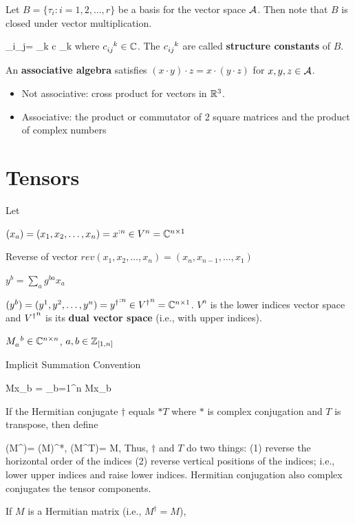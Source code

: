 Let $B = \{\tau_i: i=1, 2, \ldots, r\}$
be a basis for the vector space ${\cal A}$. 
Then note that
$B$ is closed under vector multiplication. 

\beq
\tau_i\cdot \tau_j=
\sum_k c \tau_k
\eeq
where $c\indices{_{ij}^k}\in\CC$.
The $c\indices{_{ij}^k}$ are called 
{\bf structure constants} of $B$.

An {\bf associative algebra} satisfies 
$(x\cdot y)\cdot z = x\cdot(y\cdot z)$ for
$x,y,z\in {\cal A}$.
\begin{itemize}
\item Not associative: cross product for vectors in  ${ \mathbb{R}}^3$.
\item Associative:
the product or commutator of 2  square matrices and the product of complex numbers
\end{itemize}

\section{Tensors}
\label{sec-tensors}
Let 

$(x_a)=(x_1, x_2, \ldots, x_n) = x^{:n}\in V^n={ \mathbb{C}}^{n\times 1}$

Reverse of vector $rev(x_1, x_2, \ldots, x_n)=
(x_n, x_{n-1},
\ldots, x_1)$

$y^b = \sum_a g^{ba} x_a$

$(y^b)=(y^1, y^2, \ldots, y^n)= {y^\dagger}^{:n}\in {V^\dagger}^n={ \mathbb{C}}^{n\times 1}$. $V^n$ is the lower indices vector space and
${V^\dagger}^n$ is its {\bf dual vector space} (i.e., with upper indices).



$M\indices{_a^b}\in \CC^{n\times n}$, $a, b\in{\mathbb{Z}}_{[1,n]}$

Implicit Summation Convention

\beq
Mx_b = \sum_{b=1}^n
Mx_b
\eeq



If the Hermitian conjugate $\dagger$
equals $*T$ where $*$ is complex conjugation and $T$ is transpose,
then define

\beq
(M^\dagger)= (M)^*,
\quad
(M^T)= M,
\eeq
Thus, $\dagger$ and $T$ 
do two things: (1) reverse the horizontal order of the indices (2)
reverse vertical positions
of the indices; i.e., 
lower upper indices and raise lower indices.
Hermitian conjugation 
also complex conjugates the tensor components.

If $M$ is a Hermitian matrix (i.e., $M^\dagger =M$),

